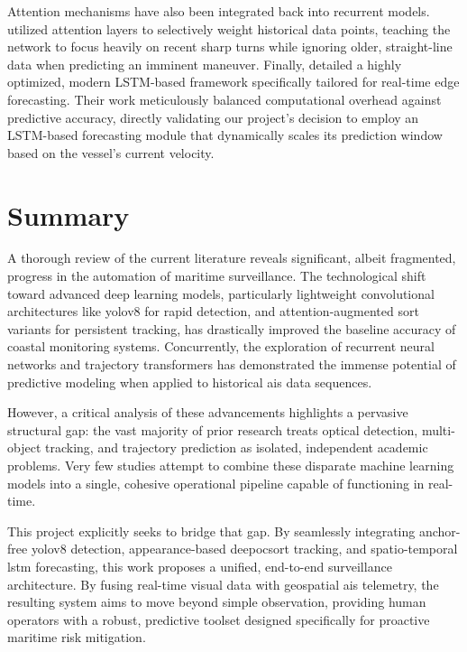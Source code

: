 Attention mechanisms have also been integrated back into recurrent models. \cite{Zang2024} utilized attention layers to selectively weight historical data points, teaching the network to focus heavily on recent sharp turns while ignoring older, straight-line data when predicting an imminent maneuver. Finally, \cite{Aouedi2026} detailed a highly optimized, modern LSTM-based framework specifically tailored for real-time edge forecasting. Their work meticulously balanced computational overhead against predictive accuracy, directly validating our project's decision to employ an LSTM-based forecasting module that dynamically scales its prediction window based on the vessel's current velocity.

\section{Summary}

A thorough review of the current literature reveals significant, albeit fragmented, progress in the automation of maritime surveillance. The technological shift toward advanced deep learning models, particularly lightweight convolutional architectures like \gls{yolov8} for rapid detection, and attention-augmented \gls{sort} variants for persistent tracking, has drastically improved the baseline accuracy of coastal monitoring systems. Concurrently, the exploration of recurrent neural networks and trajectory transformers has demonstrated the immense potential of predictive modeling when applied to historical \gls{ais} data sequences.

However, a critical analysis of these advancements highlights a pervasive structural gap: the vast majority of prior research treats optical detection, multi-object tracking, and trajectory prediction as isolated, independent academic problems. Very few studies attempt to combine these disparate machine learning models into a single, cohesive operational pipeline capable of functioning in real-time. 

This project explicitly seeks to bridge that gap. By seamlessly integrating anchor-free \gls{yolov8} detection, appearance-based \gls{deepocsort} tracking, and spatio-temporal \gls{lstm} forecasting, this work proposes a unified, end-to-end surveillance architecture. By fusing real-time visual data with geospatial \gls{ais} telemetry, the resulting system aims to move beyond simple observation, providing human operators with a robust, predictive toolset designed specifically for proactive maritime risk mitigation.
